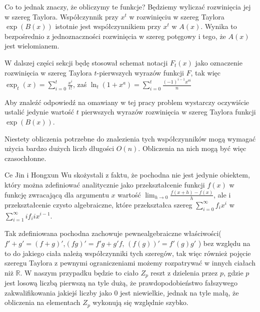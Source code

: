 \documentclass{article}
\begin{document}
Co to jednak znaczy, że obliczymy te funkcje? Będziemy wyliczać rozwinięcia jej w szereg Taylora.
Współczynnik przy $x^t$ w rozwinięciu w szereg Taylora $\exp(B(x))$ istotnie jest współczynnikiem
przy $x^t$ w $A(x)$. Wynika to bezpośrednio z jednoznaczności rozwinięcia w szereg potęgowy i tego, że $A(x)$ jest wielomianem. 

W dalszej części sekcji będę stosował schemat notacji $F_t(x)$ jako oznaczenie rozwinięcia w szereg Taylora 
$t$-pierwszych wyrazów funkcji $F$, tak więc $\exp_t(x) = \sum_{i=0}^t\frac{x^i}{i!}$, zaś 
$\ln_t(1+x^a)=\sum_{i=0}^t\frac{(-1)^{i-1}x^{ai}}{n}$ 

Aby znaleźć odpowiedź na omawiany w tej pracy problem wystarczy oczywiście ustalić jedynie 
wartość $t$ pierwszych wyrazów rozwinięcia w szereg Taylora funkcji $\exp(B(x))$.

Niestety obliczenia potrzebne do znalezienia tych współczynników mogą wymagać użycia bardzo dużych liczb długości $O(n)$. 
Obliczenia na nich mogą być więc czasochłonne. 

Ce Jin i Hongxun Wu skożystali z faktu, że
pochodna nie jest jedynie obiektem, który można zdefiniować analitycznie jako przekształcenie funkcji 
$f(x)$ w funkcję zwracającą dla argumentu $x$ wartość $\lim_{h \to 0}\frac{f(x+h)-f(x)}{h}$, ale 
i przekształcenie czysto algebraiczne, które przekształca szereg $\sum_{i=0}^{\infty}f_i x^i$ w
$\sum_{i=1}^{\infty}if_{i}ix^{i-1}$. 

Tak zdefiniowana pochodna zachowuje pewnealgebraiczne właściwości($f'+g'=(f+g)'$,$(fg)'=f'g+g'f$,
$(f(g))'=f'(g)g'$ ) bez względu na to do jakiego ciała należą współczynniki tych szeregów, tak więc również pojęcie szeregu
Taylora z pewnymi ograniczeniami   możemy rozpatrywać w innych ciałach niż $\mathbb{R}$. W naszym przypadku będzie to ciało 
$Z_p$ reszt z dzielenia przez $p$, gdzie $p$ jest losową liczbą pierwszą na tyle dużą, że prawdopodobieństwo fałszywego zakwalifikowania
jakiejś liczby jako $0$ jest niewielkie, jednak na tyle małą, że obliczenia na elementach $Z_p$ wykonują się względnie szybko.

\end{document}
